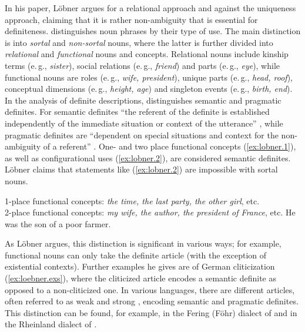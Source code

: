 \documentclass[output=paper]{langsci/langscibook}
\begin{document}
In his \citeyear{lobner:85} paper, L\"obner argues for a relational approach and against the uniqueness approach, claiming that it is rather non-ambiguity that is essential for definiteness. \citet{lobner:85} distinguishes noun phrases by their type of use. The main distinction is into {\emph{sortal}} and {\emph{non-sortal}} nouns, where the latter is further divided into {\emph{relational}} and {\emph{functional}} nouns and concepts. Relational nouns include kinship terms (e.\,g., {\emph{sister}}), social relations (e.\,g., {\emph{friend}}) and parts (e.\,g., {\emph{eye}}), while functional nouns are roles (e.\,g., {\emph{wife, president}}), unique parts (e.\,g., {\emph{head, roof}}), conceptual dimensions (e.\,g., {\emph{height, age}}) and singleton events (e.\,g., {\emph{birth, end}}). In the analysis of definite descriptions, \citet{lobner:85} distinguishes semantic and pragmatic definites. For semantic definites ``the referent of the definite is established independently of the immediate situation or context of the utterance'' \citep[][p.298]{lobner:85}, while pragmatic definites are ``dependent on special situations and context for the non-ambiguity of a referent'' \citep[][p.298]{lobner:85}. One- and two place functional concepts (\ref{ex:lobner.1}), as well as configurational uses (\ref{ex:lobner.2}), are considered semantic definites. Löbner claims that statements like (\ref{ex:lobner.2}) are impossible with sortal nouns. 

\begin{exe}
\ex\label{ex:lobner.1}
1-place functional concepts: {\emph{the time, the last party, the other girl}}, etc. \\
2-place functional concepts: {\emph{my wife, the author, the president of France}}, etc.
\ex\label{ex:lobner.2}
He was the son of a poor farmer.	\hfill\citep[][ex.17]{lobner:85}
\end{exe}

As L\"obner argues, this distinction is significant in various ways; for example, functional nouns can only take the definite article (with the exception of existential contexts). Further examples he gives are of German cliticization (\ref{ex:loebner.exs}), where the cliticized article encodes a semantic definite as opposed to a non-cliticized one. In various languages, there are different articles, often referred to as weak and strong \citep{schwarz:19}, encoding semantic and pragmatic definites. This distinction can be found, for example, in the Fering (F\"ohr) dialect of  \citep[e.\,g.,][]{ebert:71} and in the Rheinland dialect of  \citep[e.\,g.,][]{hartmann:82}.
\end{document}
